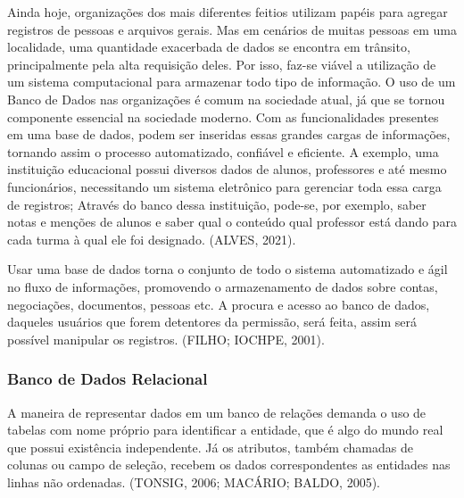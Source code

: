\documentclass[a4paper,12pt]{article}
\begin{document}
Ainda hoje, organizações dos mais diferentes feitios utilizam papéis para agregar registros de pessoas e arquivos gerais. Mas em cenários
de muitas pessoas em uma localidade, uma quantidade exacerbada de dados se encontra em trânsito, principalmente pela alta requisição deles. 
Por isso, faz-se viável a utilização de um sistema computacional para armazenar todo tipo de informação. O uso de um Banco de Dados nas 
organizações é comum na sociedade atual, já que se tornou componente essencial na sociedade moderno. Com as funcionalidades presentes em 
uma base de dados, podem ser inseridas essas grandes cargas de informações, tornando assim o processo automatizado, confiável e eficiente. 
A exemplo, uma instituição educacional possui diversos dados de alunos, professores e até mesmo funcionários, necessitando um sistema 
eletrônico para gerenciar toda essa carga de registros; Através do banco dessa instituição, pode-se, por exemplo, saber notas e menções 
de alunos e saber qual o conteúdo qual professor está dando para cada turma à qual ele foi designado. (ALVES, 2021).

Usar uma base de dados torna o conjunto de todo o sistema automatizado e ágil no fluxo de informações, promovendo o armazenamento 
de dados sobre contas, negociações, documentos, pessoas etc. A procura e acesso ao banco de dados, daqueles usuários que forem detentores 
da permissão, será feita, assim será possível manipular os registros. (FILHO; IOCHPE, 2001).

\subsubsection{Banco de Dados Relacional}
A maneira de representar dados em um banco de relações demanda o uso de tabelas com nome próprio para identificar a entidade, que é 
algo do mundo real que possui existência independente. Já os atributos, também chamadas de colunas ou campo de seleção, recebem os 
dados correspondentes as entidades nas linhas não ordenadas. (TONSIG, 2006; MACÁRIO; BALDO, 2005). 
\end{document}
